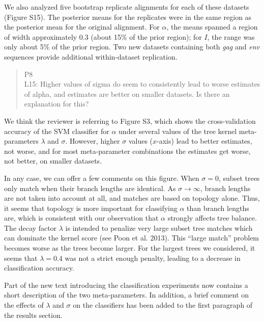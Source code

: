 \documentclass[12pt]{letter}
\begin{document}
\begin{letter}{ }
We also analyzed five bootstrap replicate alignments for each of these
datasets (Figure S15). The posterior means for the replicates were in the same
region as the posterior mean for the original alignment. For $\alpha$, the
means spanned a region of width approximately 0.3 (about 15\% of the prior
region); for $I$, the range was only about 5\% of the prior region. Two new
datasets containing both \textit{gag} and \textit{env} sequences provide
additional within-dataset replication.

\begin{quote}
  \itshape

  P8 \\
  L15: Higher values of sigma do seem to consistently lead to worse estimates
  of alpha, and estimates are better on smaller datasets. Is there an
  explanation for this?
\end{quote}

We think the reviewer is referring to Figure S3, which shows the
cross-validation accuracy of the SVM classifier for $\alpha$ under several
values of the tree kernel meta-parameters $\lambda$ and $\sigma$. However,
higher $\sigma$ values ($x$-axis) lead to better estimates, not worse, and for
most meta-parameter combinations the estimates get worse, not better, on
smaller datasets. 

In any case, we can offer a few comments on this figure. When $\sigma = 0$,
subset trees only match when their branch lengths are identical. As $\sigma \to
\infty$, branch lengths are not taken into account at all, and matches are
based on topology alone. Thus, it seems that topology is more important for
classifying $\alpha$ than branch lengths are, which is consistent with our
observation that $\alpha$ strongly affects tree balance. The decay factor
$\lambda$ is intended to penalize very large subset tree matches which can
dominate the kernel score (see Poon et al. 2013). This ``large match'' problem
becomes worse as the trees become larger. For the largest trees we considered, 
it seems that $\lambda = 0.4$ was not a strict enough penalty, leading to a
decrease in classification accuracy. 

Part of the new text introducing the classification experiments now contains a
short description of the two meta-parameters. In addition, a brief comment
on the effects of $\lambda$ and $\sigma$ on the classifiers has been added to
the first paragraph of the results section.

\begin{quote}
  \itshape


\end{quote}
\end{letter}
\end{document}
